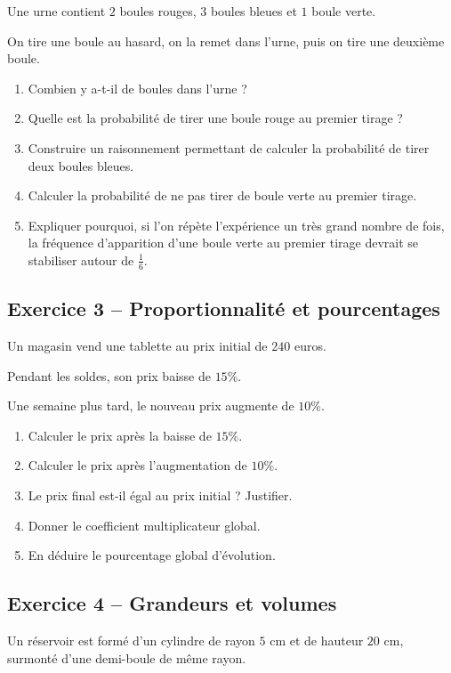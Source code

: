 \documentclass[11pt,a4paper]{article}
\begin{document}
Une urne contient $2$ boules rouges, $3$ boules bleues et $1$ boule verte.

On tire une boule au hasard, on la remet dans l'urne, puis on tire une deuxième boule.

\begin{enumerate}
    \item Combien y a-t-il de boules dans l'urne ?
    \item Quelle est la probabilité de tirer une boule rouge au premier tirage ?
    \item Construire un raisonnement permettant de calculer la probabilité de tirer deux boules bleues.
    \item Calculer la probabilité de ne pas tirer de boule verte au premier tirage.
    \item Expliquer pourquoi, si l'on répète l'expérience un très grand nombre de fois, la fréquence d'apparition d'une boule verte au premier tirage devrait se stabiliser autour de $\frac{1}{6}$.
\end{enumerate}

\subsection*{Exercice 3 -- Proportionnalité et pourcentages}

Un magasin vend une tablette au prix initial de $240$ euros.

Pendant les soldes, son prix baisse de $15\%$.

Une semaine plus tard, le nouveau prix augmente de $10\%$.

\begin{enumerate}
    \item Calculer le prix après la baisse de $15\%$.
    \item Calculer le prix après l'augmentation de $10\%$.
    \item Le prix final est-il égal au prix initial ? Justifier.
    \item Donner le coefficient multiplicateur global.
    \item En déduire le pourcentage global d'évolution.
\end{enumerate}

\subsection*{Exercice 4 -- Grandeurs et volumes}

Un réservoir est formé d'un cylindre de rayon $5$ cm et de hauteur $20$ cm, surmonté d'une demi-boule de même rayon.
\end{document}
